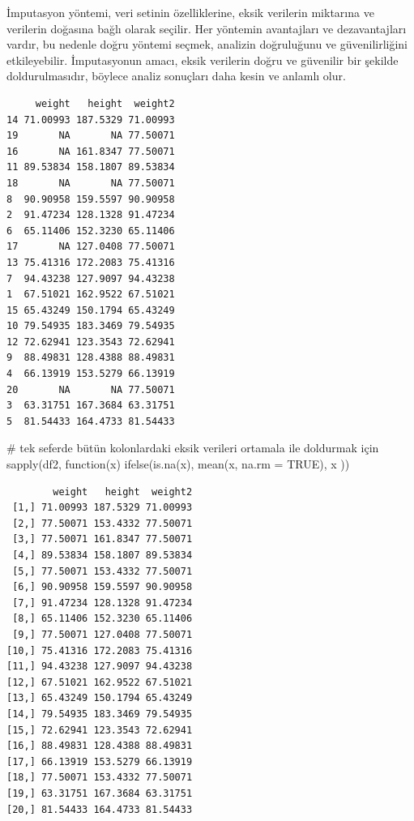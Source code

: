 \documentclass[
  letterpaper,
  DIV=11,
  numbers=noendperiod]{scrreprt}
\newenvironment{Shaded}{\begin{snugshade}}{\end{snugshade}}
\newcommand{\AttributeTok}[1]{\textcolor[rgb]{0.40,0.45,0.13}{#1}}
\newcommand{\CommentTok}[1]{\textcolor[rgb]{0.37,0.37,0.37}{#1}}
\newcommand{\ConstantTok}[1]{\textcolor[rgb]{0.56,0.35,0.01}{#1}}
\newcommand{\ControlFlowTok}[1]{\textcolor[rgb]{0.00,0.23,0.31}{#1}}
\newcommand{\FunctionTok}[1]{\textcolor[rgb]{0.28,0.35,0.67}{#1}}
\newcommand{\NormalTok}[1]{\textcolor[rgb]{0.00,0.23,0.31}{#1}}
\newcommand{\OtherTok}[1]{\textcolor[rgb]{0.00,0.23,0.31}{#1}}
\newcommand{\SpecialCharTok}[1]{\textcolor[rgb]{0.37,0.37,0.37}{#1}}
\begin{document}
İmputasyon yöntemi, veri setinin özelliklerine, eksik verilerin
miktarına ve verilerin doğasına bağlı olarak seçilir. Her yöntemin
avantajları ve dezavantajları vardır, bu nedenle doğru yöntemi seçmek,
analizin doğruluğunu ve güvenilirliğini etkileyebilir. İmputasyonun
amacı, eksik verilerin doğru ve güvenilir bir şekilde doldurulmasıdır,
böylece analiz sonuçları daha kesin ve anlamlı olur.

\begin{Shaded}
\end{Shaded}

\begin{verbatim}
     weight   height  weight2
14 71.00993 187.5329 71.00993
19       NA       NA 77.50071
16       NA 161.8347 77.50071
11 89.53834 158.1807 89.53834
18       NA       NA 77.50071
8  90.90958 159.5597 90.90958
2  91.47234 128.1328 91.47234
6  65.11406 152.3230 65.11406
17       NA 127.0408 77.50071
13 75.41316 172.2083 75.41316
7  94.43238 127.9097 94.43238
1  67.51021 162.9522 67.51021
15 65.43249 150.1794 65.43249
10 79.54935 183.3469 79.54935
12 72.62941 123.3543 72.62941
9  88.49831 128.4388 88.49831
4  66.13919 153.5279 66.13919
20       NA       NA 77.50071
3  63.31751 167.3684 63.31751
5  81.54433 164.4733 81.54433
\end{verbatim}

\begin{Shaded}
\begin{Highlighting}[]
\CommentTok{\# tek seferde bütün kolonlardaki eksik verileri ortamala ile doldurmak için}
\FunctionTok{sapply}\NormalTok{(df2, }\ControlFlowTok{function}\NormalTok{(x) }\FunctionTok{ifelse}\NormalTok{(}\FunctionTok{is.na}\NormalTok{(x), }\FunctionTok{mean}\NormalTok{(x, }\AttributeTok{na.rm =} \ConstantTok{TRUE}\NormalTok{), x ))}
\end{Highlighting}
\end{Shaded}

\begin{verbatim}
        weight   height  weight2
 [1,] 71.00993 187.5329 71.00993
 [2,] 77.50071 153.4332 77.50071
 [3,] 77.50071 161.8347 77.50071
 [4,] 89.53834 158.1807 89.53834
 [5,] 77.50071 153.4332 77.50071
 [6,] 90.90958 159.5597 90.90958
 [7,] 91.47234 128.1328 91.47234
 [8,] 65.11406 152.3230 65.11406
 [9,] 77.50071 127.0408 77.50071
[10,] 75.41316 172.2083 75.41316
[11,] 94.43238 127.9097 94.43238
[12,] 67.51021 162.9522 67.51021
[13,] 65.43249 150.1794 65.43249
[14,] 79.54935 183.3469 79.54935
[15,] 72.62941 123.3543 72.62941
[16,] 88.49831 128.4388 88.49831
[17,] 66.13919 153.5279 66.13919
[18,] 77.50071 153.4332 77.50071
[19,] 63.31751 167.3684 63.31751
[20,] 81.54433 164.4733 81.54433
\end{verbatim}
\end{document}
